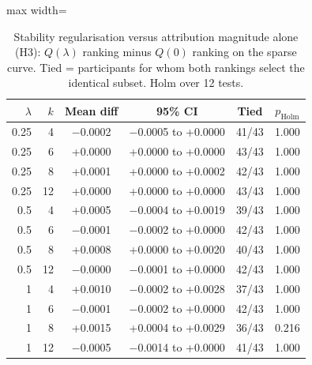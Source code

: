 \begin{table}[t]
\centering
\small
\caption{Stability regularisation versus attribution magnitude alone (H3): $Q(\lambda)$ ranking minus $Q(0)$ ranking on the sparse curve. Tied = participants for whom both rankings select the identical subset. Holm over 12 tests.}
\label{tab:lambda}
\setlength{\tabcolsep}{4pt}
\begin{adjustbox}{max width=\textwidth}
\begin{tabular}{rrcccc}
\toprule
$\lambda$ & $k$ & Mean diff & 95\% CI & Tied & $p_{\mathrm{Holm}}$ \\
\midrule
0.25 & 4 & $-$0.0002 & $-$0.0005 to +0.0000 & 41/43 & 1.000 \\
0.25 & 6 & +0.0000 & +0.0000 to +0.0000 & 43/43 & 1.000 \\
0.25 & 8 & +0.0001 & +0.0000 to +0.0002 & 42/43 & 1.000 \\
0.25 & 12 & +0.0000 & +0.0000 to +0.0000 & 43/43 & 1.000 \\
0.5 & 4 & +0.0005 & $-$0.0004 to +0.0019 & 39/43 & 1.000 \\
0.5 & 6 & $-$0.0001 & $-$0.0002 to +0.0000 & 42/43 & 1.000 \\
0.5 & 8 & +0.0008 & +0.0000 to +0.0020 & 40/43 & 1.000 \\
0.5 & 12 & $-$0.0000 & $-$0.0001 to +0.0000 & 42/43 & 1.000 \\
1 & 4 & +0.0010 & $-$0.0002 to +0.0028 & 37/43 & 1.000 \\
1 & 6 & $-$0.0001 & $-$0.0002 to +0.0000 & 42/43 & 1.000 \\
1 & 8 & +0.0015 & +0.0004 to +0.0029 & 36/43 & 0.216 \\
1 & 12 & $-$0.0005 & $-$0.0014 to +0.0000 & 41/43 & 1.000 \\
\bottomrule
\end{tabular}
\end{adjustbox}
\end{table}
